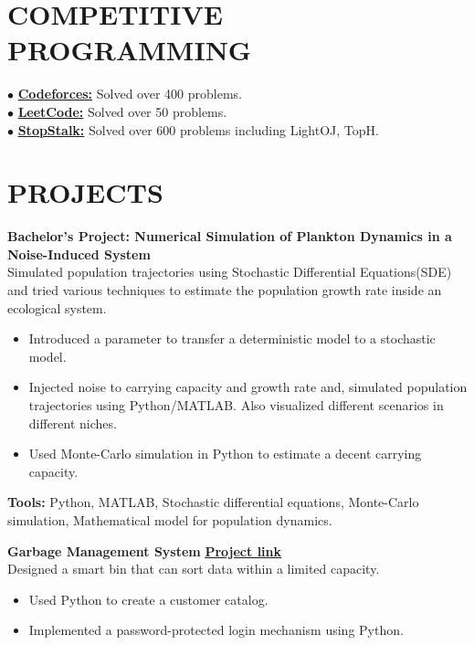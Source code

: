\documentclass[letterpaper,11pt]{article}
\begin{document}
\section*{COMPETITIVE PROGRAMMING}
    \large $\bullet$ \href{https://codeforces.com/profile/Shohan06}{\textbf{Codeforces:}} Solved over 400 problems. \\
    \large $\bullet$ \href{https://leetcode.com/u/Shohan06/}{\textbf{LeetCode:}} Solved over 50 problems. \\
    \large $\bullet$ \href{https://www.stopstalk.com/user/profile/shohan093}{\textbf{StopStalk:}} Solved over 600 problems including LightOJ, TopH.

\section*{PROJECTS}
    \textbf{Bachelor's Project: Numerical Simulation of Plankton Dynamics in a Noise-Induced System} \\
    Simulated population trajectories using Stochastic Differential Equations(SDE) and tried various techniques to estimate the population growth rate inside an ecological system.
    \begin{itemize}
        \item Introduced a parameter to transfer a deterministic model to a stochastic model.
        \item Injected noise to carrying capacity and growth rate and, simulated population trajectories using Python/MATLAB. Also visualized different scenarios in different niches.
        \item Used Monte-Carlo simulation in Python to estimate a decent carrying capacity.
    \end{itemize}
    \textbf{Tools:} Python, MATLAB, Stochastic differential equations, Monte-Carlo simulation, Mathematical model for population dynamics. \vspace{7pt}

    \textbf{Garbage Management System} \hfill \href{https://github.com/Shohan093/Garbage-Collection-System}{\underline{\textbf{Project link}}} \\
    Designed a smart bin that can sort data within a limited capacity.
    \begin{itemize}
        \item Used Python to create a customer catalog.
        \item Implemented a password-protected login mechanism using Python.
    \end{itemize}
\end{document}

